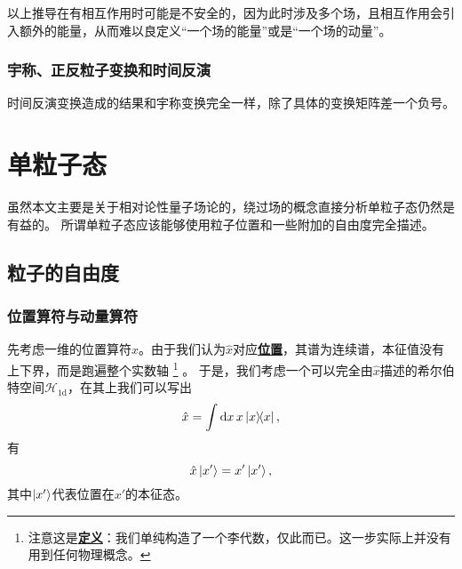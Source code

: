 \documentclass[hyperref, UTF8, a4paper]{ctexart}
\newcommand{\concept}[1]{\underline{\textbf{#1}}}
\begin{document}
以上推导在有相互作用时可能是不安全的，因为此时涉及多个场，且相互作用会引入额外的能量，从而难以良定义“一个场的能量”或是“一个场的动量”。

\subsubsection{宇称、正反粒子变换和时间反演}

时间反演变换造成的结果和宇称变换完全一样，除了具体的变换矩阵差一个负号。


\section{单粒子态}\label{sec:single-particle}

虽然本文主要是关于相对论性量子场论的，绕过场的概念直接分析单粒子态仍然是有益的。
所谓单粒子态应该能够使用粒子位置和一些附加的自由度完全描述。

\subsection{粒子的自由度}\label{sec:single-particle-quantity}

\subsubsection{位置算符与动量算符}\label{sec:position-and-momentum}

先考虑一维的位置算符$\hat{x}$。由于我们认为$\hat{x}$对应\concept{位置}，其谱为连续谱，本征值没有上下界，而是跑遍整个实数轴%
\footnote{注意这是\concept{定义}：我们单纯构造了一个李代数，仅此而已。这一步实际上并没有用到任何物理概念。}%
。
于是，我们考虑一个可以完全由$\hat{x}$描述的希尔伯特空间$\mathcal{H}_{1\text{d}}$，在其上我们可以写出
\begin{equation}
    \hat{x} = \int \dd{x} x \dyad{x},
\end{equation}
有
\begin{equation}
    \hat{x} \ket{x'} = x' \ket{x'},
\end{equation}
其中$\ket{x'}$代表位置在$x'$的本征态。
\end{document}

